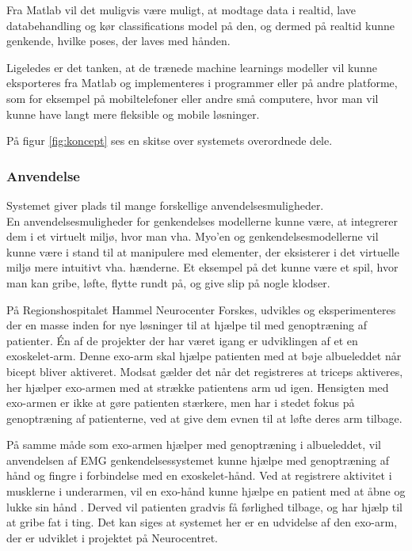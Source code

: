 Fra Matlab vil det muligvis være muligt, at modtage data i realtid, lave databehandling og kør classifications model på den, og dermed på realtid kunne genkende, hvilke poses, der laves med hånden.

Ligeledes er det tanken, at de trænede machine learnings modeller vil kunne eksporteres fra Matlab og implementeres i programmer eller på andre platforme, som for eksempel på mobiltelefoner eller andre små computere, hvor man vil kunne have langt mere fleksible og mobile løsninger.


På figur \ref{fig:koncept} ses en skitse over systemets overordnede dele.

\subsubsection{Anvendelse}
Systemet giver plads til mange forskellige anvendelsesmuligheder.\\

En anvendelsesmuligheder for genkendelses modellerne kunne være, at integrerer dem i et virtuelt miljø, hvor man vha. Myo’en og genkendelsesmodellerne vil kunne være i stand til at manipulere med elementer, der eksisterer i det virtuelle miljø mere intuitivt vha. hænderne. Et eksempel på det kunne være et spil, hvor man kan gribe, løfte, flytte rundt på, og give slip på nogle klodser.

På Regionshospitalet Hammel Neurocenter Forskes, udvikles og eksperimenteres der en masse inden for nye løsninger til at hjælpe til med genoptræning af patienter. Én af de projekter der har været igang er udviklingen af et en exoskelet-arm. Denne exo-arm skal hjælpe patienten med at bøje albueleddet når bicept bliver aktiveret. Modsat gælder det når det registreres at triceps aktiveres, her hjælper exo-armen med at strække patientens arm ud igen. Hensigten med exo-armen er ikke at gøre patienten stærkere, men har i stedet fokus på genoptræning af patienterne, ved at give dem evnen til at løfte deres arm tilbage.

På samme måde som exo-armen hjælper med genoptræning i albueleddet, vil anvendelsen af EMG genkendelsessystemet kunne hjælpe med genoptræning af hånd og fingre i forbindelse med en exoskelet-hånd. Ved at registrere aktivitet i musklerne i underarmen, vil en exo-hånd kunne hjælpe en patient med at åbne og lukke sin hånd . Derved vil patienten gradvis få førlighed tilbage, og har hjælp til at gribe fat i ting. Det kan siges at systemet her er en udvidelse af den exo-arm, der er udviklet i projektet på Neurocentret.

